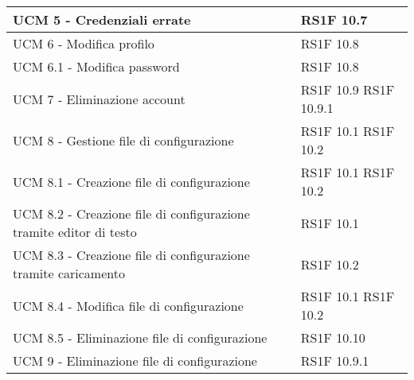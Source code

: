 \begin{center}
\begin{longtable}{ | p{5cm} | p{5cm} |}
            UCM 5 - Credenziali errate &  RS1F 10.7 \newline  \\ \hline      
            UCM 6 - Modifica profilo &  RS1F 10.8 \newline  \\ \hline      
            UCM 6.1 - Modifica password &  RS1F 10.8 \newline  \\ \hline      
            UCM 7 - Eliminazione account &  RS1F 10.9 \newline  RS1F 10.9.1 \newline  \\ \hline      
            UCM 8 - Gestione file di configurazione &  RS1F 10.1 \newline  RS1F 10.2 \newline  \\ \hline      
            UCM 8.1 - Creazione file di configurazione &  RS1F 10.1 \newline  RS1F 10.2 \newline  \\ \hline      
            UCM 8.2 - Creazione file di configurazione tramite editor di testo &  RS1F 10.1 \newline  \\ \hline      
            UCM 8.3 - Creazione file di configurazione tramite caricamento &  RS1F 10.2 \newline  \\ \hline      
            UCM 8.4 - Modifica file di configurazione &  RS1F 10.1 \newline  RS1F 10.2 \newline  \\ \hline      
            UCM 8.5 - Eliminazione file di configurazione &  RS1F 10.10 \newline  \\ \hline      
            UCM 9 - Eliminazione file di configurazione &  RS1F 10.9.1 \newline  \\ \hline     
      \end{longtable}
      \egroup
      \end{center}  
\clearpage

